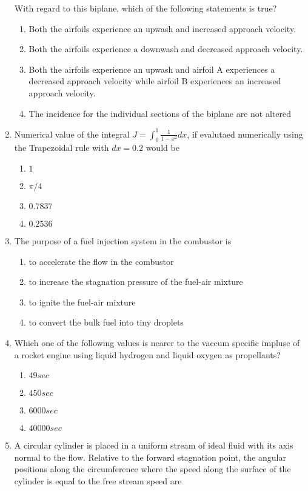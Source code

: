 \documentclass[journal]{IEEEtran}
\begin{document}
\begin{enumerate}
		With regard to this biplane, which of the following statements is true?
		\begin{enumerate}
			\item Both the airfoils experience an upwash and increased approach velocity.
			\item Both the airfoils experience a downwash and decreased approach velocity.
			\item Both the airfoils experience an upwash and airfoil A experiences a decreased approach velocity while airfoil B experiences an increased approach velocity.
			\item The incidence for the individual sections of the biplane are not altered
		\end{enumerate}
	\item Numerical value of the integral
		$J=\int_0^1\frac{1}{1-x^2}dx$, if evalutaed numerically using the Trapezoidal rule with $dx = 0.2$ would be
		\begin{enumerate}
			\item $1$
			\item $\pi/4$
			\item $0.7837$
			\item $0.2536$
		\end{enumerate}
	\item The purpose of a fuel injection system in the combustor is
		\begin{enumerate}
			\item to accelerate the flow in the combustor
			\item to increase the stagnation pressure of the fuel-air mixture
			\item to ignite the fuel-air mixture
			\item to convert the bulk fuel into tiny droplets
		\end{enumerate}
	\item Which one of the following values is nearer to the vaccum specific impluse of a rocket engine using liquid hydrogen and liquid oxygen as propellants?
		\begin{enumerate}
			\item $49 sec$
			\item $450 sec$
			\item $6000 sec$
			\item $40000 sec$
		\end{enumerate}
	\item A circular cylinder is placed in a uniform stream of ideal fluid with its axis normal to the flow. Relative to the forward stagnation point, the angular positions along the circumference where the speed along the surface of the cylinder is equal to the free stream speed are

\end{enumerate}
\end{document}

